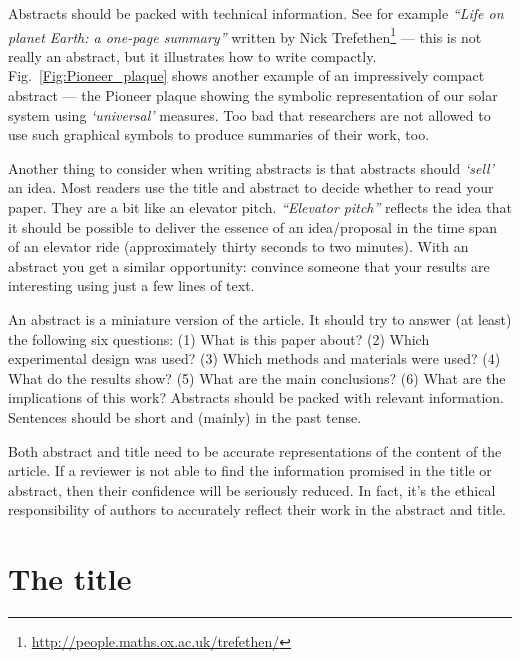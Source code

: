 \documentclass[graybox,envcountchap,sectrefs,UStrade]{svmono}
\begin{document}
Abstracts should be packed with technical information. See for example \emph{``Life on planet Earth: a one-page summary''} written by Nick Trefethen\footnote{\url{http://people.maths.ox.ac.uk/trefethen/}} --- this is not really an abstract, but it illustrates how to write compactly. Fig.\@~\ref{Fig:Pioneer_plaque} shows another example of an impressively compact abstract --- the Pioneer plaque showing the symbolic representation of our solar system using \emph{`universal'} measures. Too bad that researchers are not allowed to use such graphical symbols to produce summaries of their work, too. \par

Another thing to consider when writing abstracts is that abstracts should \emph{`sell'} an idea. Most readers use the title and abstract to decide whether to read your paper. They are a bit like an elevator pitch. \emph{``Elevator pitch''} reflects the idea that it should be possible to deliver the essence of an idea/proposal in the time span of an elevator ride (approximately thirty seconds to two minutes). With an abstract you get a similar opportunity: convince someone that your results are interesting using just a few lines of text.\par

\begin{svgraybox}
An abstract is a miniature version of the article. It should try to answer (at least) the following six questions: (1) What is this paper about? (2) Which experimental design was used? (3) Which methods and materials were used? (4) What do the results show? (5) What are the main conclusions? (6) What are the implications of this work? Abstracts should be packed with relevant information. Sentences should be short and (mainly) in the past tense.
\end{svgraybox}

Both abstract and title need to be accurate representations of the content of the article. If a reviewer is not able to find the information promised in the title or abstract, then their confidence will be seriously reduced. In fact, it's the ethical responsibility of authors to accurately reflect their work in the abstract and title.\par


\section{The title}
\end{document}
